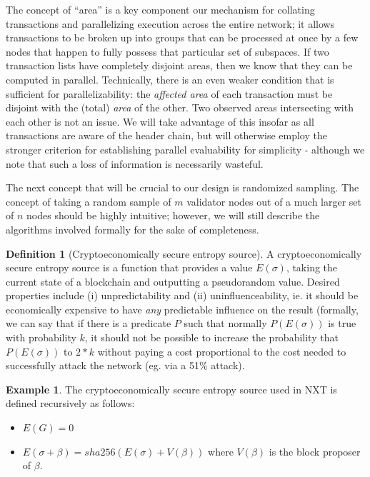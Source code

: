 \documentclass[11pt,a4paper]{article}
\theoremstyle{plain}
\theoremstyle{definition}
\newtheorem{defn}{Definition}[section]
\newtheorem{exmp}{Example}[section]
\theoremstyle{remark}
\begin{document}
The concept of ``area'' is a key component our mechanism for collating transactions and parallelizing execution across the entire network; it allows transactions to be broken up into groups that can be processed at once by a few nodes that happen to fully possess that particular set of subspaces. If two transaction lists have completely disjoint areas, then we know that they can be computed in parallel. Technically, there is an even weaker condition that is sufficient for parallelizability: the \emph{affected area} of each transaction must be disjoint with the (total) \emph{area} of the other. Two observed areas intersecting with each other is not an issue. We will take advantage of this insofar as all transactions are aware of the header chain, but will otherwise employ the stronger criterion for establishing parallel evaluability for simplicity - although we note that such a loss of information is necessarily wasteful.

The next concept that will be crucial to our design is randomized sampling. The concept of taking a random sample of $m$ validator nodes out of a much larger set of $n$ nodes should be highly intuitive; however, we will still describe the algorithms involved formally for the sake of completeness.

\begin{defn}[Cryptoeconomically secure entropy source]
A cryptoeconomically secure entropy source is a function that provides a value $E(\sigma)$, taking the current state of a blockchain and outputting a pseudorandom value. Desired properties include (i) unpredictability and (ii) uninfluenceability, ie. it should be economically expensive to have \emph{any} predictable influence on the result (formally, we can say that if there is a predicate $P$ such that normally $P(E(\sigma))$ is true with probability $k$, it should not be possible to increase the probability that $P(E(\sigma))$ to $2 * k$ without paying a cost proportional to the cost needed to successfully attack the network (eg. via a 51\% attack).
\end{defn}

\begin{exmp}
The cryptoeconomically secure entropy source used in NXT\cite{nxtinside} is defined recursively as follows:
\begin{itemize}
\item
$E(G) = 0$
\item 
$E(\sigma + \beta) = sha256(E(\sigma) + V(\beta))$ where $V(\beta)$ is the block proposer of $\beta$.
\end{itemize}
\end{exmp}
\end{document}
